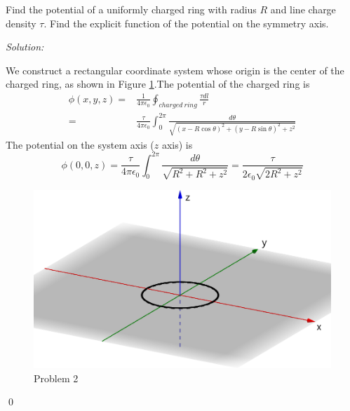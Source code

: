 \documentclass[12pt]{article}
\newenvironment{problem}[2][Problem]{\begin{trivlist}
\item[\hskip \labelsep {\bfseries #1}\hskip \labelsep {\bfseries #2.}]}{\end{trivlist}}
\newenvironment{sol}
    {\emph{Solution:}
    }
    {
    \qed
    }
\begin{document}
\begin{problem}{2}
Find the potential of a uniformly charged ring with radius $R$ and line charge density $\tau$. Find the explicit function of the potential on the symmetry axis.
\end{problem}
\begin{sol}
We construct a rectangular coordinate system whose origin is the center of the charged ring, as shown in Figure \ref{Problem2}.The potential of the charged ring is
\begin{align*}
\phi(x,y,z)=&\frac{1}{4\pi\epsilon_0}\oint_{charged~ring}\frac{\tau dl}{r}\\
=&\frac{\tau}{4\pi\epsilon_0}\int_0^{2\pi}\frac{d\theta}{\sqrt{(x-R\cos\theta)^2+(y-R\sin\theta)^2+z^2}}
\end{align*}
The potential on the system axis ($z$ axis) is
\[
\phi(0,0,z)=\frac{\tau}{4\pi\epsilon_0}\int_0^{2\pi}\frac{d\theta}{\sqrt{R^2+R^2+z^2}}=\frac{\tau}{2\epsilon_0\sqrt{2R^2+z^2}}
\]
\begin{figure}[h]
\centering
\includegraphics[scale=.3]{Homework_3Problem_2.png}
\caption{Problem 2} \label{Problem2}
\end{figure}
\end{sol}
\end{document}
